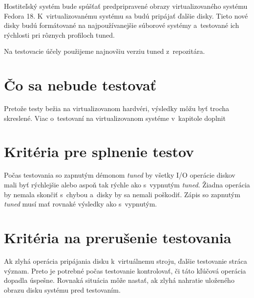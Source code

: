 Hostiteľský systém bude spúšťať predpripravené obrazy virtualizovaného systému
Fedora 18. K~virtualizovanému systému sa budú pripájať ďalšie disky. Tieto nové
disky budú formátované na najpoužívanejšie súborové systémy a~testované ich
rýchlosti pri rôznych profiloch tuned.

Na testovacie účely použijeme najnovšiu verziu tuned z~repozitára.

\section{Čo sa nebude testovať}

Pretože testy bežia na virtualizovanom hardvéri, výsledky môžu byť trocha
skreslené. Viac o~testovaní na virtualizovanom systéme v~kapitole %
doplnit


\section{Kritéria pre splnenie testov}

Počas testovania so zapnutým démonom \emph{tuned} by všetky I/O operácie diskov
mali byť rýchlejšie alebo aspoň tak rýchle ako s~vypnutým \emph{tuned}. Žiadna
operácia by nemala skončiť s~chybou a~disky by sa nemali poškodiť. Zápis so
zapnutým \emph{tuned} musí mať rovnaké výsledky ako s~vypnutým.

\section{Kritéria na prerušenie testovania}

Ak zlyhá operácia pripájania disku k~virtuálnemu stroju, ďalšie testovanie
stráca význam. Preto je potrebné počas testovanie kontrolovať, či táto kľúčová
operácia dopadla úspešne. Rovnaká situácia môže nastať, ak zlyhá nahratie
uloženého obrazu disku systému pred testovaním.


